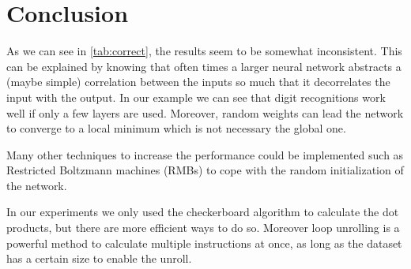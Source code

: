 \documentclass{acm_proc_article-sp}
\begin{document}
\section{Conclusion}

As we can see in \ref{tab:correct}, the results seem to be somewhat inconsistent. This can be explained by knowing that often times a larger neural network abstracts a (maybe simple) correlation between the inputs so much that it decorrelates the input with the output. In our example we can see that digit recognitions work well if only a few layers are used.
Moreover, random weights can lead the network to converge to a local minimum which is not necessary the global one.

Many other techniques to increase the performance could be implemented such as Restricted Boltzmann machines (RMBs) to cope with the random initialization of the network.

In our experiments we only used the checkerboard algorithm to calculate the dot products, but there are more efficient ways to do so. Moreover loop unrolling is a powerful method to calculate multiple instructions at once, as long as the dataset has a certain size to enable the unroll.


\newpage



\balancecolumns
\end{document}
